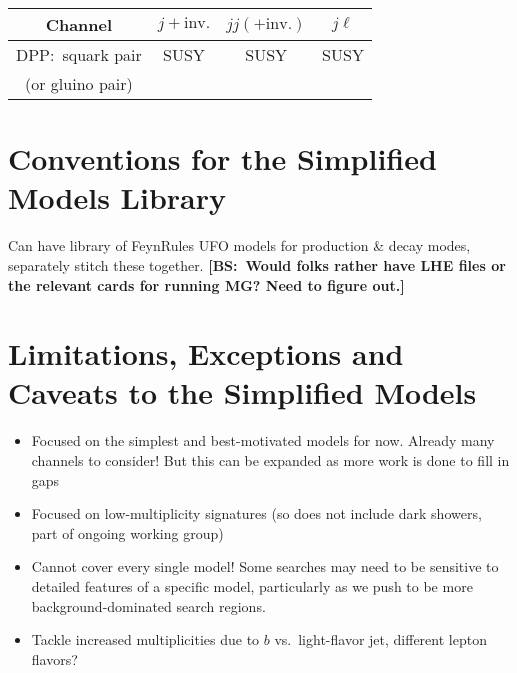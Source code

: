 \begin{center}
\begin{tabular}{ |c|c|c|c|} 
 \hline
Channel & $j+\mathrm{inv.}$ &  $jj(+\mathrm{inv.})$ & $j\ell$ \\
\hline\hline
DPP:~squark pair & SUSY & SUSY & SUSY \\
(or gluino pair) & & &\\
\hline
\end{tabular}
\end{center}

\section{Conventions for the Simplified Models Library}
Can have library of FeynRules UFO models for production \& decay modes, separately stitch these together. {\bf [BS:~Would folks rather have LHE files or the relevant cards for running MG? Need to figure out.]}

\section{Limitations, Exceptions and Caveats to the Simplified Models}
\begin{itemize}
\item Focused on the simplest and best-motivated models for now. Already many channels to consider! But this can be expanded as more work is done to fill in gaps
\item Focused on low-multiplicity signatures (so does not include dark showers, part of ongoing working group)
\item Cannot cover every single model! Some searches may need to be sensitive to detailed features of a specific model, particularly as we push to be more background-dominated search regions.
\item Tackle increased multiplicities due to $b$ vs.~light-flavor jet, different lepton flavors?
\end{itemize}
